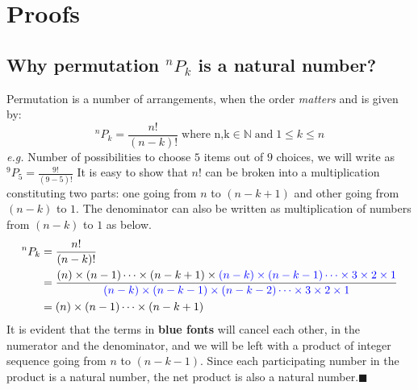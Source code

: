 \documentclass[12pt, twoside]{article}
\newcommand*{\Permutation}[2]{{}^{#1}P_{#2}}%
\begin{document}
	\section{Proofs}
	\subsection{Why permutation $\Permutation{n}{k}$ is a natural number?}
	Permutation is a number of arrangements, when the order \textit{matters} and is given by:
	\begin{equation}
		\Permutation{n}{k} = \frac{n!}{(n-k)!}  \; \text{where n,k} \in \mathbb{N}  \; \text{and} \; 1 \leq k \leq n
	\end{equation}
	 \textit{e.g.} Number of possibilities to choose $5$ items out of $9$ choices, we will write as $\Permutation{9}{5} =\frac{9!}{(9-5)!}$\newline
	 It is easy to show that $n!$ can be broken into a multiplication constituting two parts: one going from $n$ to $(n-k+1)$ and other going from $(n-k)$ to $1$. The denominator can also be written as multiplication of numbers from {\color{blue}$(n-k)$ to $1$} as below.
	 \begin{align*}
	 	\Permutation{n}{k} &= \frac{n!}{(n-k)!}\\
	 	&= \frac{(n)\times(n-1)\cdots\times(n-k+1)\times\color{blue}(n-k)\times(n-k-1)\cdots\times3\times2\times1}{\color{blue}(n-k)\times(n-k-1)\times(n-k-2)\cdots\times3\times2\times1}\\
	 	&= (n)\times(n-1)\cdots\times(n-k+1)
	 \end{align*}
 	It is evident that the terms in \textbf{\color{blue}blue fonts} will cancel each other, in the numerator and the denominator, and we will be left with a product of integer sequence going from $n$ to $(n-k-1)$. Since each participating number in the product is a natural number, the net product is also a natural number.$\blacksquare$
\end{document}
